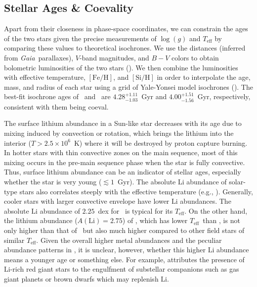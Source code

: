 \documentclass[modern, letterpaper]{aastex61}
\newcommand{\project}[1]{\textsl{#1}}
\newcommand{\gaia}{\project{Gaia}}
\newcommand*\elem[1]{\ensuremath{\mathrm{#1}}}
\newcommand*\elemH[1]{\ensuremath{[\mathrm{#1}/\elem{H}]}}
\newcommand*\teff{\ensuremath{T_\mathrm{eff}}}
\newcommand{\sunanalog}{\text{Krios}}
\newcommand{\bizarreone}{\text{Kronos}}
\begin{document}

\subsection{Stellar Ages \& Coevality}
\label{sub:ages}

Apart from their closeness in phase-space coordinates,
we can constrain the ages of the two stars
given the precise measurements of $\log(g)$ and $T_\mathrm{eff}$
by comparing these values to theoretical isochrones.
We use the distances (inferred from \gaia\ parallaxes), $V$-band magnitudes,
and $B-V$ colors to obtain bolometric luminosities of the two stars
(\citealt{2003AJ....126..778V}).
We then combine the luminosities with effective temperature, \elemH{Fe}, and
\elemH{Si} in order to interpolate the age, mass, and radius of each star using
a grid of Yale-Yonsei model isochrones (\citealt{2013ApJ...776...87S}).
The best-fit isochrone ages of \bizarreone\ and \sunanalog\ are
$4.28_{-1.03}^{+1.11}$~Gyr and $4.00_{-1.56}^{+1.51}$~Gyr, respectively,
consistent with them being coeval.

The surface lithium abundance in a Sun-like star decreases with its age due to
mixing induced by convection or rotation, which brings the lithium into the
interior ($T>2.5 \times 10^{6}$~K) where it will be destroyed by proton capture
burning.
In hotter stars with thin convective zones on the main sequence, most of this
mixing occurs in the pre-main sequence phase when the star is fully convective.
Thus, surface lithium abundance can be an indicator of stellar ages,
especially whether the star is very young ($\lesssim 1$~Gyr).
The absolute $\elem{Li}$ abundance of solar-type stars also correlates steeply
with the effective temperature (e.g., \citealt{Chen2001,2012ApJ...756...46R}).
Generally, cooler stars with larger convective envelope have lower \elem{Li}
abundances.
The absolute $\elem{Li}$ abundance of $2.25$~dex for \sunanalog\
is typical for its \teff.
On the other hand, the lithium abundance ($A(\elem{Li}) = 2.75$) of \bizarreone,
which has lower \teff\ than \sunanalog, is not only higher than that of
\sunanalog\ but also much higher compared to other field stars of similar \teff.
Given the overall higher metal abundances and the peculiar abundance patterns
in \bizarreone, it is unclear, however, whether this higher $\elem{Li}$
abundance means a younger age or something else.
For example, \citealt{Casey:2016aa} attributes the presence of $\elem{Li}$-rich
red giant stars to the engulfment of substellar companions such as gas giant
planets or brown dwarfs which may replenish $\elem{Li}$.
\end{document}
